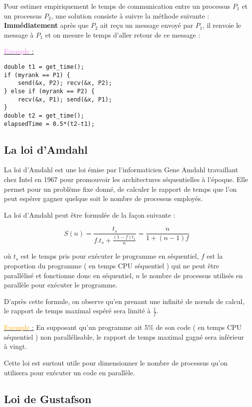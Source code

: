 \documentclass[fleqn,11pt]{article}
\begin{document}
Pour estimer empiriquement le temps de communication entre un processus $P_{1}$ et un processus $P_{2}$,
une solution consiste à suivre la méthode suivante : \textbf{Immédiatement} après que $P_{2}$ ait reçu
un message envoyé par $P_{1}$, il renvoie le message à $P_{1}$ et on mesure le temps d'aller retour de ce
message :

\underline{\textcolor{violet}{Exemple} :}

\begin{lstlisting}
double t1 = get_time();
if (myrank == P1) {
    send(&x, P2); recv(&x, P2);
} else if (myrank == P2) {
    recv(&x, P1); send(&x, P1);
}
double t2 = get_time();
elapsedTime = 0.5*(t2-t1);
\end{lstlisting}

\subsection{La loi d'Amdahl}

La loi d'Amdahl est une loi émise par l'informaticien Gene Amdahl travaillant chez Intel en 1967 
pour promouvoir les architectures séquentielles à l'époque. Elle permet pour un problème fixe
donné, de calculer le rapport de temps que l'on peut espérer gagner quelque soit le nombre
de processus employés.

La loi d'Amdahl peut être formulée de la façon suivante :

\begin{equation}
 S(n) = \frac{t_{s}}{f.t_{s}+\frac{(1-f)t_{s}}{n}} = \frac{n}{1+(n-1)f}
\end{equation}

où $t_{s}$ est le temps pris pour exécuter le programme en séquentiel, $f$ est la proportion du programme
( en temps CPU séquentiel ) qui ne peut être parallélisé et fonctionne donc en séquentiel, $n$ le nombre de processus utilisés en
parallèle pour exécuter le programme.

D'après cette formule, on observe qu'en prenant une infinité de n{\oe}uds de calcul, le rapport de temps maximal
espéré sera limité à $\frac{1}{f}$.

\underline{\textcolor{orange}{Exemple} :} En supposant qu'un programme ait 5\% de son code ( en temps CPU
séquentiel ) non parallélisable, le rapport de temps maximal gagné sera inférieur à vingt.

Cette loi est surtout utile pour dimensionner le nombre de processus qu'on utilisera pour exécuter un code en parallèle.

\subsection{Loi de Gustafson}
\end{document}
